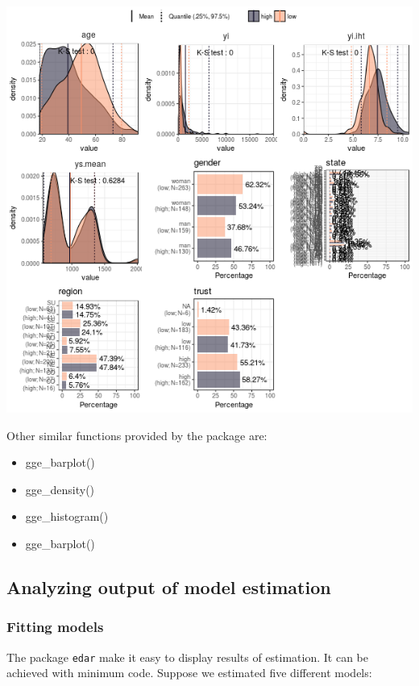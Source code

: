\documentclass[a4paper]{article}
\begin{document}
\begin{center}
\includegraphics[width=.9\linewidth]{gge_describe_group.png}
\end{center}


Other similar functions provided by the package are:
\begin{itemize}
\item gge\_barplot()
\item gge\_density()
\item gge\_histogram()
\item gge\_barplot()
\end{itemize}
\subsection{Analyzing output of model estimation}
\label{sec:orgc35e977}
\subsubsection{Fitting models}
\label{sec:orgb4ae9c3}

The package \texttt{edar} make it easy to display results of estimation. It can be achieved with minimum code. Suppose we estimated five different models:
\end{document}
